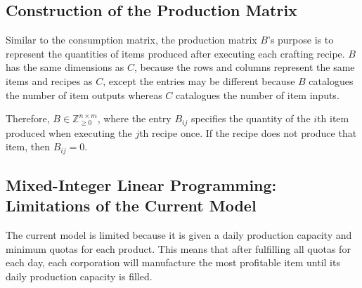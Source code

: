 \documentclass[11pt, a4paper]{article}
\begin{document}
\subsection{Construction of the Production Matrix}
Similar to the consumption matrix, the production matrix $B$'s purpose is to represent the quantities of items produced after executing each crafting recipe.
$B$ has the same dimensions as $C$, because the rows and columns represent the same items and recipes as $C$, except the entries may be different because $B$ catalogues the number of item outputs
whereas $C$ catalogues the number of item inputs.

Therefore, $B \in \mathbb{Z}_{\geq 0}^{n \times m}$, where the entry $B_{ij}$ specifies the quantity of the $i$th item produced when executing the $j$th recipe once.
If the recipe does not produce that item, then $B_{ij} = 0$.


\subsection{Mixed-Integer Linear Programming: Limitations of the Current Model}
The current model is limited because it is given a daily production capacity and minimum quotas for each product.
This means that after fulfilling all quotas for each day, each corporation will manufacture the most profitable item until
its daily production capacity is filled.
\end{document}
